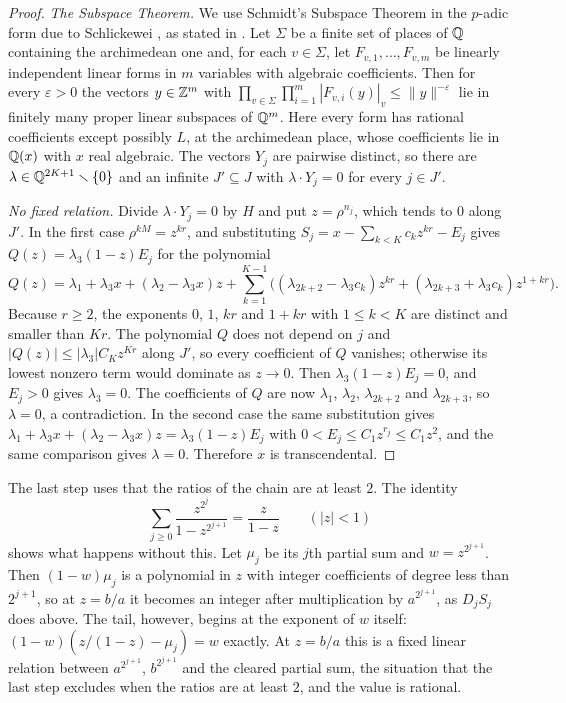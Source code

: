 \documentclass[11pt]{article}
\begin{document}
\begin{proof}
\emph{The Subspace Theorem.} We use Schmidt's Subspace Theorem in the
$p$-adic form due to Schlickewei \cite{schmidt1972,schlickewei1976}, as stated
in \cite[Theorem~2.3]{bilu2008}. Let $\Sigma$ be a finite set of places of $\mathbb{Q}$
containing the archimedean one and, for each $v\in\Sigma$, let
$F_{v,1},\dots,F_{v,m}$ be linearly independent linear forms in $m$ variables
with algebraic coefficients. Then for every $\varepsilon>0$ the vectors
$y\in\mathbb{Z}^m$ with
$\prod_{v\in\Sigma}\prod_{i=1}^m|F_{v,i}(y)|_v\le\|y\|^{-\varepsilon}$ lie in
finitely many proper linear subspaces of $\mathbb{Q}^m$. Here every form has rational
coefficients except possibly $L$, at the archimedean place, whose coefficients
lie in $\mathbb{Q}(x)$ with $x$ real algebraic. The vectors $Y_j$ are pairwise distinct, so there are
$\lambda\in\mathbb{Q}^{2K+1}\smallsetminus\{0\}$ and an infinite $J'\subseteq J$ with
$\lambda\cdot Y_j=0$ for every $j\in J'$.

\emph{No fixed relation.} Divide $\lambda\cdot Y_j=0$ by $H$ and put
$z=\rho^{n_j}$, which tends to $0$ along $J'$. In the first case
$\rho^{kM}=z^{kr}$, and substituting $S_j=x-\sum_{k<K}c_kz^{kr}-E_j$ gives
$Q(z)=\lambda_3(1-z)E_j$ for the polynomial
\[
 Q(z)=\lambda_1+\lambda_3x+(\lambda_2-\lambda_3x)z
 +\sum_{k=1}^{K-1}\bigl((\lambda_{2k+2}-\lambda_3c_k)z^{kr}
 +(\lambda_{2k+3}+\lambda_3c_k)z^{1+kr}\bigr).
\]
Because $r\ge2$, the exponents $0$, $1$, $kr$ and $1+kr$ with $1\le k<K$ are
distinct and smaller than $Kr$. The polynomial $Q$ does not depend on $j$ and
$|Q(z)|\le|\lambda_3|C_Kz^{Kr}$ along $J'$, so every coefficient of $Q$
vanishes; otherwise its lowest nonzero term would dominate as $z\to0$. Then
$\lambda_3(1-z)E_j=0$, and $E_j>0$ gives $\lambda_3=0$. The coefficients of $Q$
are now $\lambda_1$, $\lambda_2$, $\lambda_{2k+2}$ and $\lambda_{2k+3}$, so
$\lambda=0$, a contradiction. In the second case the same substitution gives
$\lambda_1+\lambda_3x+(\lambda_2-\lambda_3x)z=\lambda_3(1-z)E_j$ with
$0<E_j\le C_1z^{r_j}\le C_1z^2$, and the same comparison gives $\lambda=0$.
Therefore $x$ is transcendental.
\end{proof}

The last step uses that the ratios of the chain are at least $2$. The identity
\[
 \sum_{j\ge0}\frac{z^{2^j}}{1-z^{2^{j+1}}}=\frac{z}{1-z}\qquad(|z|<1)
\]
shows what happens without this. Let $\mu_j$ be its $j$th partial sum and
$w=z^{2^{j+1}}$. Then $(1-w)\mu_j$ is a polynomial in $z$ with integer
coefficients of degree less than $2^{j+1}$, so at $z=b/a$ it becomes an integer
after multiplication by $a^{2^{j+1}}$, as $D_jS_j$ does above. The tail,
however, begins at the exponent of $w$ itself: $(1-w)(z/(1-z)-\mu_j)=w$
exactly. At $z=b/a$ this is a fixed linear relation between $a^{2^{j+1}}$,
$b^{2^{j+1}}$ and the cleared partial sum, the situation that the last step
excludes when the ratios are at least $2$, and the value is rational.
\end{document}
